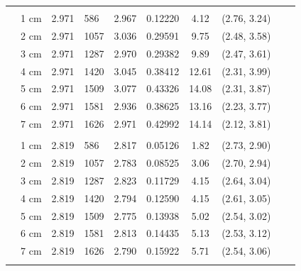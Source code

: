 \documentclass[a4paper 12pt]{article}
\numberwithin{equation}{section}
\begin{document}
\begin{small}
\begin{table}[h!]
\begin{footnotesize}
\begin{tabular}{clclclclcl}
 \raisebox{1ex}{age 5}  \\ [1.0ex]
&  1 cm  & 2.971 &  586&   2.967   &         0.12220& 4.12  & (2.76, 3.24) \\
&   2 cm & 2.971 &  1057&  3.036   &         0.29591& 9.75  & (2.48, 3.58) \\
&   3 cm & 2.971 &  1287&  2.970   &         0.29382& 9.89  & (2.47, 3.61) \\
&   4 cm & 2.971 &  1420&  3.045   &         0.38412& 12.61 & (2.31, 3.99) \\
&   5 cm & 2.971 &  1509&  3.077   &         0.43326& 14.08 & (2.31, 3.87)\\
&   6 cm & 2.971 &  1581&  2.936   &         0.38625& 13.16 & (2.23, 3.77)\\
&   7 cm & 2.971 &  1626&  2.971   &         0.42992& 14.14 & (2.12, 3.81)\\[1.2ex]

 \raisebox{1ex}{\bf age 6+} &   \\ [1.0ex]
&   1 cm & 2.819  & 586 &  2.817 &           0.05126& 1.82 & (2.73, 2.90) \\
&   2 cm & 2.819  & 1057&  2.783 &           0.08525& 3.06 & (2.70, 2.94) \\
&   3 cm & 2.819  & 1287&  2.823 &           0.11729& 4.15 & (2.64, 3.04) \\
&   4 cm & 2.819  & 1420&  2.794 &           0.12590& 4.15 & (2.61, 3.05) \\
&   5 cm & 2.819  & 1509&  2.775 &           0.13938& 5.02 & (2.54, 3.02) \\
&   6 cm & 2.819  & 1581&  2.813 &           0.14435& 5.13 & (2.53, 3.12)  \\
&   7 cm & 2.819  & 1626&  2.790 &           0.15922& 5.71 & (2.54, 3.06)  \\[0.1ex]
   \hline \\
\end{tabular}
\end{footnotesize}
\end{table}
 \end{small}
 

\clearpage
\end{document}
